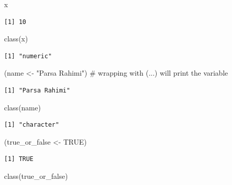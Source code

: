 \documentclass[
  letterpaper,
]{book}
\newenvironment{Shaded}{\begin{snugshade}}{\end{snugshade}}
\newcommand{\CommentTok}[1]{\textcolor[rgb]{0.37,0.37,0.37}{#1}}
\newcommand{\ConstantTok}[1]{\textcolor[rgb]{0.56,0.35,0.01}{#1}}
\newcommand{\FunctionTok}[1]{\textcolor[rgb]{0.28,0.35,0.67}{#1}}
\newcommand{\NormalTok}[1]{\textcolor[rgb]{0.00,0.23,0.31}{#1}}
\newcommand{\OtherTok}[1]{\textcolor[rgb]{0.00,0.23,0.31}{#1}}
\newcommand{\StringTok}[1]{\textcolor[rgb]{0.13,0.47,0.30}{#1}}
\begin{document}
\begin{Shaded}
\begin{Highlighting}[]
\NormalTok{x}
\end{Highlighting}
\end{Shaded}

\begin{verbatim}
[1] 10
\end{verbatim}

\begin{Shaded}
\begin{Highlighting}[]
\FunctionTok{class}\NormalTok{(x)}
\end{Highlighting}
\end{Shaded}

\begin{verbatim}
[1] "numeric"
\end{verbatim}

\begin{Shaded}
\begin{Highlighting}[]
\NormalTok{(name }\OtherTok{\textless{}{-}} \StringTok{"Parsa Rahimi"}\NormalTok{) }\CommentTok{\# wrapping with (...) will print the variable}
\end{Highlighting}
\end{Shaded}

\begin{verbatim}
[1] "Parsa Rahimi"
\end{verbatim}

\begin{Shaded}
\begin{Highlighting}[]
\FunctionTok{class}\NormalTok{(name)}
\end{Highlighting}
\end{Shaded}

\begin{verbatim}
[1] "character"
\end{verbatim}

\begin{Shaded}
\begin{Highlighting}[]
\NormalTok{(true\_or\_false }\OtherTok{\textless{}{-}} \ConstantTok{TRUE}\NormalTok{)}
\end{Highlighting}
\end{Shaded}

\begin{verbatim}
[1] TRUE
\end{verbatim}

\begin{Shaded}
\begin{Highlighting}[]
\FunctionTok{class}\NormalTok{(true\_or\_false)}
\end{Highlighting}
\end{Shaded}
\end{document}
